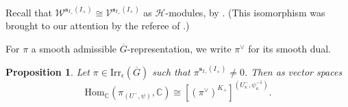 \documentclass[11pt]{amsart}
\theoremstyle{plain}
\newtheorem{Prop}[equation]{Proposition}
\theoremstyle{definition}
\numberwithin{equation}{section}
\newcommand{\C}{\mathbb{C}}
\newcommand{\Gt}{\overline{G}}
\newcommand{\s}{\mathbf{s}}
\newcommand{\Hcal}{\mathcal{H}}
\begin{document}
Recall that $\mathcal{W}^{\s_{I_{+}}(I_{+})}\cong \mathcal{V}^{\s_{I_{+}}(I_{+})}$ as $\Hcal$-modules, by \cite[Lemmas 5.1-5.3]{GGK24}. (This isomorphism was brought to our attention by the referee of \cite{GGK24}.) 

For $\pi$ a smooth admissible $\Gt$-representation, we write $\pi^{\vee}$ for its smooth dual.

\begin{Prop}\label{Prop:Whit_lift}
    Let $\pi\in\mathrm{Irr}_{\epsilon}(\Gt)$ such that $\pi^{\s_{I_{+}}(I_{+})}\neq 0$. Then as vector spaces
    \begin{equation*}
        \mathrm{Hom}_{\C}(\pi_{(U^{-},\psi)},\C)\cong [(\pi^{\vee})^{K_{+}}]^{(U^{-}_{\kappa},\psi_{\kappa}^{-1})}.
    \end{equation*}
\end{Prop}
\end{document}
